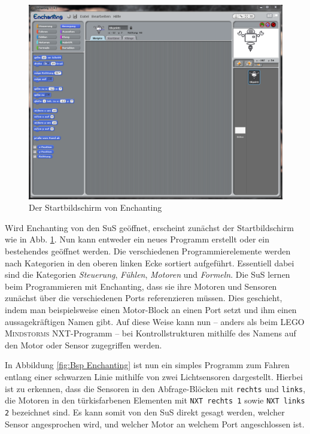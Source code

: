 \documentclass[paper=a4, DIV=calc, BCOR=12mm, twoside=on, onecolumn=on, open = right, titlepage =on, parskip =half-, headsepline = on, footsepline = off, chapterprefix = off, appendixprefix = on, fontsize = 12pt, numbers = noenddot, abstract = on]{scrbook}
\begin{document}
\begin{figure}[htbp]
\centering
\includegraphics[width=\textwidth]{images/Enchanting_Start.png} 
\caption{Der Startbildschirm von Enchanting}
\label{fig:Enchanting Start}
\end{figure}
\clearpage

Wird Enchanting von den SuS geöffnet, erscheint zunächst der Startbildschirm wie in Abb. \ref{fig:Enchanting Start}. Nun kann entweder ein neues Programm erstellt oder ein bestehendes geöffnet werden. Die verschiedenen Programmierelemente werden nach Kategorien in den oberen linken Ecke sortiert aufgeführt. Essentiell dabei sind die Kategorien \emph{Steuerung}, \emph{Fühlen}, \emph{Motoren} und \emph{Formeln}. Die SuS lernen beim Programmieren mit Enchanting, dass sie ihre Motoren und Sensoren zunächst über die verschiedenen Ports referenzieren müssen. Dies geschieht, indem man beispielsweise einen Motor-Block an einen Port setzt und ihm einen aussagekräftigen Namen gibt. Auf diese Weise kann nun -- anders als beim \textsc{LEGO Mindstorms} NXT-Programm -- bei Kontrollstrukturen mithilfe des Namens auf den Motor oder Sensor zugegriffen werden.

In Abbildung \ref{fig:Bsp Enchanting} ist nun ein simples Programm zum Fahren entlang einer schwarzen Linie mithilfe von zwei Lichtsensoren dargestellt. Hierbei ist zu erkennen, dass die Sensoren in den Abfrage-Blöcken mit \texttt{rechts} und \texttt{links}, die Motoren in den türkisfarbenen Elementen mit \texttt{NXT rechts 1} sowie \texttt{NXT links 2} bezeichnet sind. Es kann somit von den SuS direkt gesagt werden, welcher Sensor angesprochen wird, und welcher Motor an welchem Port angeschlossen ist.
\end{document}
